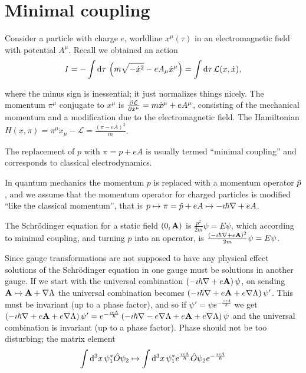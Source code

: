 \documentclass{notes}
\newcommand{\cL}{\mathcal{L}}
\begin{document}
\section{Minimal coupling}

Consider a particle with charge $e$, worldline $x^\mu(\tau)$ in an
electromagnetic field with potential $A^\mu$.  Recall we obtained an
action
\[
I = - \int \ud \tau\, \left( m \sqrt{- \dot{x}^2} - e A_\mu \dot{x}^\mu
\right) = \int \ud \tau\, \cL(x,\dot{x}), 
\]

where the minus sign is inessential; it just normalizes things nicely.  The
momentum $\pi^\mu$ conjugate to $x^\mu$ is $\pd{\cL}{\dot{x}^\mu}
= m \dot{x}^\mu + e A^\mu$, consisting of the mechanical momentum
and a modification due to the electromagnetic field.  The Hamiltonian
$H(x,\pi) = \pi^\mu \dot{x}_\mu - \cL = \frac{\left( \pi - e A\right)^2}{m}$.

The replacement of $p$ with $\pi = p + e A$ is usually termed ``minimal
coupling'' and corresponds to classical electrodynamics.

In quantum mechanics the momentum $p$ is replaced with a momentum operator
$\Hat{p}$, and we assume that the momentum operator for charged particles
is modified ``like the classical momentum'', that is
$p \mapsto \pi = \Hat{p} + e A \mapsto - \imath \hbar \nabla + e A$.

The Schr\"odinger equation for a static field $(0,\mathbf{A})$ is
$\frac{p^2}{2 m} \psi = E \psi$, which according to minimal coupling, and
turning $p$ into an operator, is $\frac{\left( - \imath \hbar \nabla
+ e \mathbf{A} \right)^2}{2 m} \psi = E \psi$.

Since gauge transformations are not supposed to have any physical effect
solutions of the Schr\"odinger equation in one gauge must be solutions in
another gauge.  If we start with the universal combination
$\left( -\imath \hbar \nabla + e \mathbf{A} \right) \psi$, on sending
$\mathbf{A} \mapsto \mathbf{A} + \nabla \Lambda$ the universal combination
becomes $\left( - \imath \hbar \nabla + e \mathbf{A}
+ e \nabla \Lambda \right) \psi'$.  This must be invariant
(up to a phase factor), and so if $\psi' = \psi e^{-\frac{\imath e \Lambda}
{\hbar}}$ we get $\left( -\imath \hbar \nabla  + e \mathbf{A} + e
\nabla \Lambda \right) \psi' = e^{-\frac{\imath e \Lambda}
{\hbar}} \left( - \imath \hbar \nabla - e \nabla \Lambda + e \mathbf{A}
+ e \nabla \Lambda \right) \psi$ and the universal combination is invariant
(up to a phase factor).  Phase should not be too disturbing; the matrix
element
\[
\int \mathrm{d}^3 x\, \psi_1^\ast \Hat{O} \psi_2 \mapsto
\int \mathrm{d}^3 x\, \psi_1^\ast e^{\frac{\imath e \Lambda}{\hbar}}
\Hat{O} \psi_2 e^{-\frac{\imath e \Lambda}{\hbar}}
\]
\end{document}
